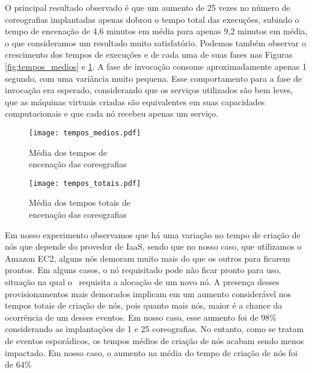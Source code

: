 O principal resultado observado é que um aumento de 25 vezes no número de coreografias implantadas apenas dobrou o tempo total das execuções, subindo o tempo de encenação de 4,6 minutos em média para apenas 9,2 minutos em média, o que consideramos um resultado muito satisfatório. Podemos também observar o crescimento dos tempos de execuções e de cada uma de suas fases nas Figuras \ref{fig:tempos_medios} e \ref{fig:tempos_totais}. A fase de invocação consome aproximadamente apenas 1 segundo, com uma variância muito pequena. Esse comportamento para a fase de invocação era esperado, considerando que os serviços utilizados são bem leves, que as máquinas virtuais criadas são equivalentes em suas capacidades computacionais e que cada nó recebeu apenas um serviço.

\begin{figure}[ht]

\begin{minipage}[b]{0.50\linewidth}
\centering
\texttt{[image: tempos\_medios.pdf]}
\caption{Média dos tempos de \\encenação das coreografias}
\label{fig:tempos_medios}
\end{minipage}
\begin{minipage}[b]{0.50\linewidth}
\centering
\texttt{[image: tempos\_totais.pdf]}
\caption{Média dos tempos totais de \\encenação das coreografias}
\label{fig:tempos_totais}
\end{minipage}

\end{figure} 

Em nosso experimento observamos que há uma variação no tempo de criação de nós que depende do provedor de IaaS, sendo que no nosso caso, que utilizamos o Amazon EC2, alguns nós demoram muito mais do que os outros para ficarem prontos. Em alguns casos, o nó requisitado pode não ficar pronto para uso, situação na qual o \ee\ requisita a alocação de um novo nó. A presença desses provisionamentos mais demorados implicam em um aumento considerável nos tempos totais de criação de nós, pois quanto mais nós, maior é a chance da ocorrência de um desses eventos. Em nosso caso, esse aumento foi de 98\% considerando as implantações de 1 e 25 coreografias. No entanto, como se tratam de eventos esporádicos, os tempos médios de criação de nós acabam sendo menos impactado. Em nosso caso, o aumento na média do tempo de criação de nós foi de 64\%

